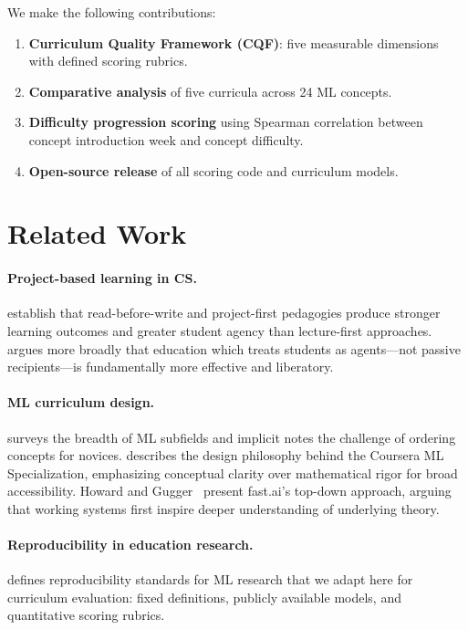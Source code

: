 \documentclass[10pt,twocolumn]{article}
\begin{document}
We make the following contributions:

\begin{enumerate}[leftmargin=*,nosep]
  \item \textbf{Curriculum Quality Framework (CQF)}: five measurable dimensions with 
        defined scoring rubrics.
  \item \textbf{Comparative analysis} of five curricula across 24 ML concepts.
  \item \textbf{Difficulty progression scoring} using Spearman correlation between 
        concept introduction week and concept difficulty.
  \item \textbf{Open-source release} of all scoring code and curriculum models.
\end{enumerate}

\section{Related Work}

\paragraph{Project-based learning in CS.}
\citet{ko2020computing} establish that read-before-write and project-first pedagogies 
produce stronger learning outcomes and greater student agency than lecture-first approaches. 
\citet{freire1970pedagogy} argues more broadly that education which treats students as 
agents—not passive recipients—is fundamentally more effective and liberatory.

\paragraph{ML curriculum design.}
\citet{jordan2015machine} surveys the breadth of ML subfields and implicit notes the 
challenge of ordering concepts for novices. 
\citet{ng2022machine} describes the design philosophy behind the Coursera ML Specialization,
emphasizing conceptual clarity over mathematical rigor for broad accessibility. 
Howard and Gugger~\citep{howard2020fastai} present fast.ai's top-down approach, 
arguing that working systems first inspire deeper understanding of underlying theory.

\paragraph{Reproducibility in education research.}
\citet{pineau2021improving} defines reproducibility standards for ML research that 
we adapt here for curriculum evaluation: fixed definitions, publicly available models, 
and quantitative scoring rubrics.
\end{document}

